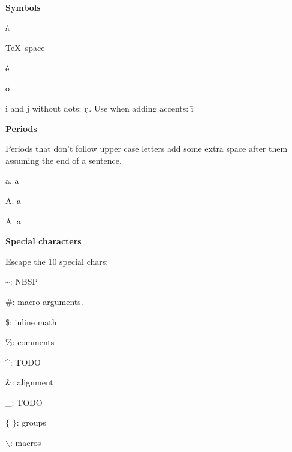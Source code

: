 \def\bs{$\backslash$}
\def\ob{$\{$}
\def\cb{$\}$}
\def\section#1{{\bf #1}}
\def\subsection#1{{\bf #1}}
\def\subsubsection#1{{\bf #1}}

\section{Symbols}

  \aa

  \dag

  \TeX\ space

  \'e

  \"o

  i and j without dots: \i \j. Use when adding accents: \=\i

  {}

  \section{Periods}

  Periods that don't follow upper case letters add some extra space after them assuming the end of a sentence.

  a. a

  A. a

  A\null. a

\section{Special characters}

  Escape the 10 special chars:

  \~{ }: NBSP

  \#: macro arguments.

  \$: inline math

  \%: comments

  \^{}: TODO

  \&: alignment

  \_: TODO

  $\{$ $\}$: groups

  $\backslash$: macros

